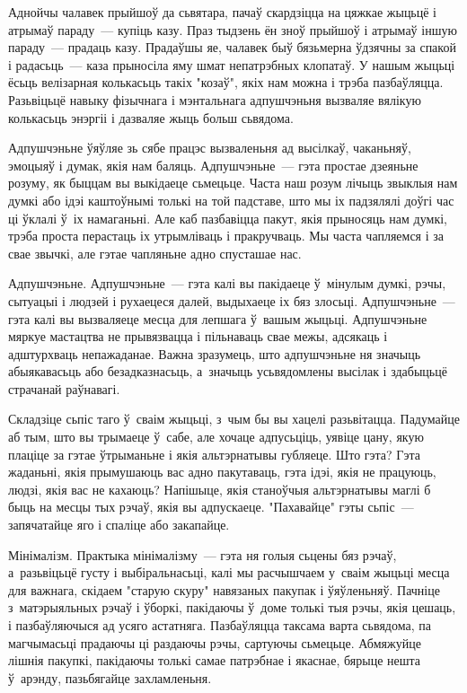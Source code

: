 Аднойчы чалавек прыйшоў да сьвятара, пачаў скардзіцца на цяжкае жыцьцё і атрымаў параду~--- купіць казу. Праз тыдзень ён зноў прыйшоў і атрымаў іншую параду~--- прадаць казу. Прадаўшы яе, чалавек быў бязьмерна ўдзячны за спакой і радасьць~--- каза прыносіла яму шмат непатрэбных клопатаў. У нашым жыцьці ёсьць велізарная колькасьць такіх "козаў", якіх нам можна і трэба пазбаўляцца. Разьвіцьцё навыку фізычнага і мэнтальнага адпушчэньня вызваляе вялікую колькасьць энэргіі і дазваляе жыць больш сьвядома.

Адпушчэньне ўяўляе зь сябе працэс вызваленьня ад высілкаў, чаканьняў, эмоцыяў і думак, якія нам баляць. Адпушчэньне~--- гэта простае дзеяньне розуму, як быццам вы выкідаеце сьмецьце. Часта наш розум лічыць звыклыя нам думкі або ідэі каштоўнымі толькі на той падставе, што мы іх падзялялі доўгі час ці ўклалі ў~іх намаганьні. Але каб пазбавіцца пакут, якія прыносяць нам думкі, трэба проста перастаць іх утрымліваць і пракручваць. Мы часта чапляемся і за свае звычкі, але гэтае чапляньне адно спусташае нас.

Адпушчэньне. Адпушчэньне~--- гэта калі вы пакідаеце ў~мінулым думкі, рэчы, сытуацыі і людзей і рухаецеся далей, выдыхаеце іх бяз злосьці. Адпушчэньне~--- гэта калі вы вызваляеце месца для лепшага ў~вашым жыцьці. Адпушчэньне мяркуе мастацтва не прывязвацца і пільнаваць свае межы, адсякаць і адштурхваць непажаданае. Важна зразумець, што адпушчэньне ня значыць абыякавасьць або безадказнасьць, а~значыць усьвядомлены высілак і здабыцьцё страчанай раўнавагі.

Складзіце сьпіс таго ў~сваім жыцьці, з~чым бы вы хацелі разьвітацца. Падумайце аб тым, што вы трымаеце ў~сабе, але хочаце адпусьціць, уявіце цану, якую плаціце за гэтае ўтрыманьне і якія альтэрнатывы губляеце. Што гэта? Гэта жаданьні, якія прымушаюць вас адно пакутаваць, гэта ідэі, якія не працуюць, людзі, якія вас не кахаюць? Напішыце, якія станоўчыя альтэрнатывы маглі б быць на месцы тых рэчаў, якія вы адпускаеце. "Пахавайце" гэты сьпіс~--- запячатайце яго і спаліце або закапайце.

Мінімалізм. Практыка мінімалізму~--- гэта ня голыя сьцены бяз рэчаў, а~разьвіцьцё густу і выбіральнасьці, калі мы расчышчаем у~сваім жыцьці месца для важнага, скідаем "старую скуру" навязаных пакупак і ўяўленьняў. Пачніце з~матэрыяльных рэчаў і ўборкі, пакідаючы ў~доме толькі тыя рэчы, якія цешаць, і пазбаўляючыся ад усяго астатняга. Пазбаўляцца таксама варта сьвядома, па магчымасьці прадаючы ці раздаючы рэчы, сартуючы сьмецьце. Абмяжуйце лішнія пакупкі, пакідаючы толькі самае патрэбнае і якаснае, бярыце нешта ў~арэнду, пазьбягайце захламленьня.

